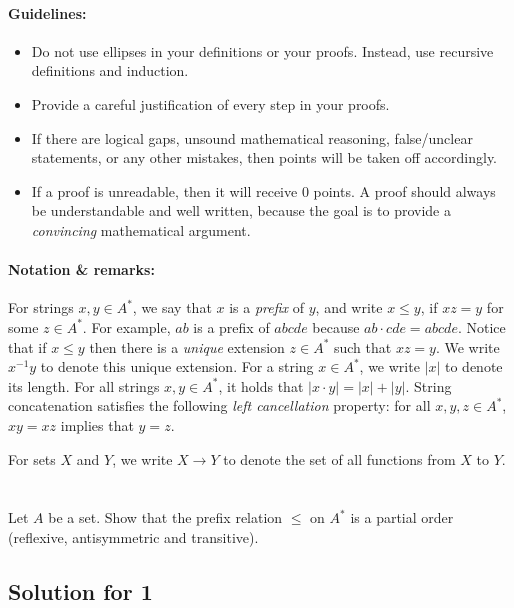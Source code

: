 \documentclass[11pt]{article}
\newcommand{\kstar}{^{\textstyle *}}
\newcommand{\inv}{^{-1}}
\begin{document}
\paragraph{Guidelines:}

\begin{itemize}
\item
Do not use ellipses in your definitions or your proofs. Instead, use recursive definitions and induction.
\item
Provide a careful justification of every step in your proofs.
\item
If there are logical gaps, unsound mathematical reasoning, false/unclear statements, or any other mistakes, then points will be taken off accordingly.
\item
If a proof is unreadable, then it will receive 0 points. A proof should always be understandable and well written, because the goal is to provide a \emph{convincing} mathematical argument.
\end{itemize}

\paragraph{Notation \& remarks:}

For strings $x, y \in A\kstar$, we say that $x$ is a \emph{prefix} of $y$, and write $x \leq y$, if $xz = y$ for some $z \in A\kstar$. For example, $ab$ is a prefix of $abcde$ because $ab \cdot cde = abcde$. Notice that if $x \leq y$ then there is a \emph{unique} extension $z \in A\kstar$ such that $xz = y$. We write $x\inv y$ to denote this unique extension. For a string $x \in A\kstar$, we write $|x|$ to denote its length. For all strings $x, y \in A\kstar$, it holds that $|x \cdot y| = |x| + |y|$. String concatenation satisfies the following \emph{left cancellation} property: for all $x, y, z \in A\kstar$, $xy = xz$ implies that $y = z$.

For sets $X$ and $Y$, we write $X \to Y$ to denote the set of all functions from $X$ to $Y$.

\clearpage %
\section*{}

Let $A$ be a set. Show that the prefix relation $\leq$ on $A\kstar$ is a partial order (reflexive, antisymmetric and transitive).

\subsection*{Solution for 1}
\end{document}
